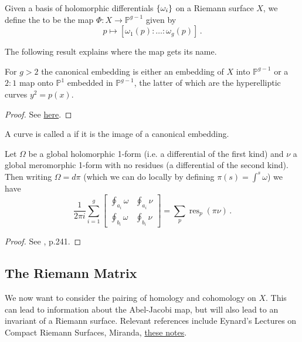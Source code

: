\documentclass{article}
\begin{document}
\begin{definition}
	Given a basis of holomorphic differentials $\left\{ \omega_i \right\}$ on a Riemann surface $X$, we define the  to be the map $\Phi:X \to \mathbb{P}^{g-1}$ given by 
	\[
	p \mapsto [\omega_1(p): \dots :\omega_g(p)] \, .
	\]
\end{definition}
The following result explains where the map gets its name. 
\begin{theorem}
	For $g>2$ the canonical embedding is either an embedding of $X$ into $\mathbb{P}^{g-1}$ or a $2:1$ map onto $\mathbb{P}^1$ embedded in $\mathbb{P}^{g-1}$, the latter of which are the hyperelliptic curves $y^2=p(x)$. 
\end{theorem}
\begin{proof}
	See \href{https://people.ucsc.edu/~rmont/classes/RiemSurfaces/2013/lectures/Jacobian.pdf}{here}. 
\end{proof}
\begin{definition}
	A curve is called a  if it is the image of a canonical embedding. 
\end{definition}

\begin{prop}
	Let $\Omega$ be a global holomorphic 1-form (i.e. a differential of the first kind) and $\nu$ a global meromorphic 1-form with no residues (a differential of the second kind). Then writing $\Omega = d \pi$ (which we can do locally by defining $\pi(s) = \int^s \omega$) we have 
	\[
	\frac{1}{2\pi i} \sum_{i=1}^g \begin{bmatrix} \oint_{a_i} \omega & \oint_{a_i} \nu \\ \oint_{b_i} \omega & \oint_{b_i} \nu \end{bmatrix} = \sum_p \operatorname{res}_p( \pi \nu) \, .
	\]
\end{prop}
\begin{proof}
	See \cite{Griffiths1985}, p.241.
\end{proof}

\subsection{The Riemann Matrix}
We now want to consider the pairing of homology and cohomology on $X$. This can lead to information about the Abel-Jacobi map, but will also lead to an invariant of a Riemann surface. Relevant references include Eynard's Lectures on Compact Riemann Surfaces, Miranda, \href{https://people.reed.edu/~jerry/311/theta.pdf}{these notes}. 
\end{document}
